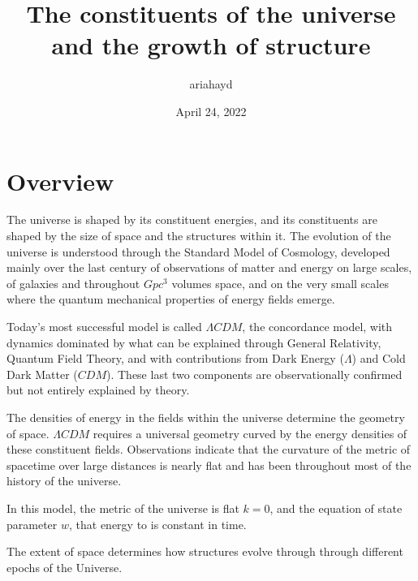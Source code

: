 \documentclass{paper}
\begin{document}
 

\title{The constituents of the universe and the growth of structure}
\author{ariahayd}
\date{April 24, 2022}
\maketitle

\section{Overview}
  The universe is shaped by its constituent energies, and its constituents are
  shaped by the size of space and the structures within it. The evolution of 
  the universe is understood through the Standard Model of Cosmology, 
  developed mainly over the last century of observations of matter and energy 
  on large scales, of galaxies and throughout \(Gpc^3\) volumes space, and on 
  the very small scales where the quantum mechanical properties of energy 
  fields emerge. 

  Today's most successful model is called \(\Lambda CDM\), the concordance
  model, with dynamics dominated by what can be explained through General 
  Relativity, Quantum Field Theory, and with contributions from Dark Energy 
  (\(\Lambda\)) and Cold Dark Matter (\(CDM\)). These last two components are 
  observationally confirmed but not entirely explained by theory. 

  The densities of energy in the fields within the universe determine the 
  geometry of space. \(\Lambda CDM\) requires a universal geometry curved by 
  the energy densities of these constituent fields. Observations indicate that 
  the curvature of the metric of spacetime over large distances is nearly 
  flat and has been throughout most of the history of the universe.
  
  In this model, the metric of the 
  universe is flat \(k=0\), and the equation of state parameter \(w\), that 
  energy to is 
  constant in time.

  The extent of space determines how structures evolve through through 
  different epochs of the Universe. 
\end{document}
